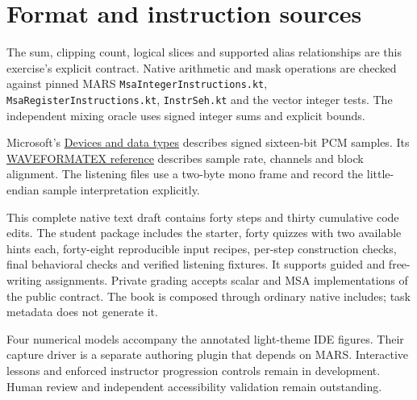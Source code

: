 \section*{Format and instruction sources}
The sum, clipping count, logical slices and supported alias relationships are this
exercise's explicit contract. Native arithmetic and mask operations are checked
against pinned MARS \texttt{MsaIntegerInstructions.kt},
\texttt{MsaRegisterInstructions.kt}, \texttt{InstrSeh.kt} and the vector integer
tests. The independent mixing oracle uses signed integer sums and explicit bounds.

Microsoft's \href{https://learn.microsoft.com/en-us/windows/win32/multimedia/devices-and-data-types}{Devices and data types}
describes signed sixteen-bit PCM samples. Its
\href{https://learn.microsoft.com/en-us/windows/win32/api/mmreg/ns-mmreg-waveformatex}{WAVEFORMATEX reference}
describes sample rate, channels and block alignment. The listening files use a
two-byte mono frame and record the little-endian sample interpretation explicitly.

This complete native text draft contains forty steps and thirty cumulative code edits.
The student package includes the starter, forty quizzes with two available hints each,
forty-eight reproducible input recipes, per-step construction checks, final behavioral
checks and verified listening fixtures. It supports guided and free-writing assignments.
Private grading accepts scalar and MSA implementations of the public contract.
The book is composed through ordinary native includes; task metadata does not generate it.

Four numerical models accompany the annotated light-theme IDE figures. Their capture
driver is a separate authoring plugin that depends on MARS. Interactive lessons and
enforced instructor progression controls remain in development. Human review and
independent accessibility validation remain outstanding.
